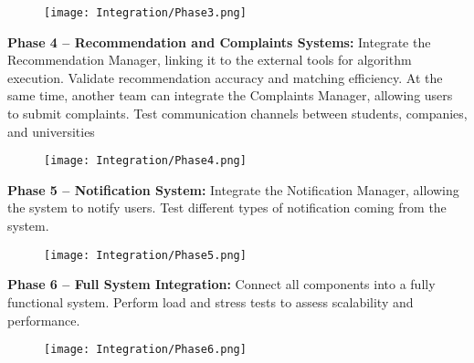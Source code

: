 \begin{figure}[H]
    \begin{center}
        \texttt{[image: Integration/Phase3.png]}
        \label{fig:Integration_3}%
    \end{center}
\end{figure}

\textbf{Phase 4 – Recommendation and Complaints Systems:} Integrate the Recommendation Manager, linking it to the external tools for algorithm execution. Validate recommendation accuracy and matching efficiency. At the same time, another team can integrate the Complaints Manager, allowing users to submit complaints. Test communication channels between students, companies, and universities

\begin{figure}[H]
    \begin{center}
        \texttt{[image: Integration/Phase4.png]}
        \label{fig:Integration_4}%
    \end{center}
\end{figure}

\textbf{Phase 5 – Notification System:} Integrate the Notification Manager, allowing the system to notify users. Test different types of notification coming from the system.

\begin{figure}[H]
    \begin{center}
        \texttt{[image: Integration/Phase5.png]}
        \label{fig:Integration_5}%
    \end{center}
\end{figure}

\textbf{Phase 6 – Full System Integration:} Connect all components into a fully functional system. Perform load and stress tests to assess scalability and performance.

\begin{figure}[H]
    \begin{center}
        \texttt{[image: Integration/Phase6.png]}
        \label{fig:Integration_6}%
    \end{center}
\end{figure}

